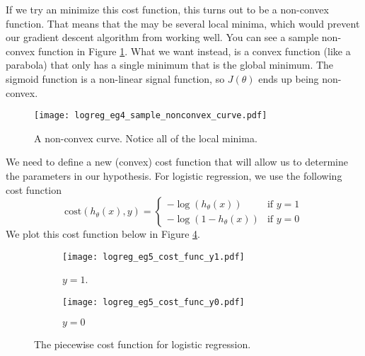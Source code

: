 If we try an minimize this cost function, this turns out to be a non-convex function. That means that the may be several local minima, which would prevent our gradient descent algorithm from working well. You can see a sample non-convex function in Figure \ref{logreg_eg4_sample_nonconvex_curve.pdf}. What we want instead, is a convex function (like a parabola) that only has a single minimum that is the global minimum. The sigmoid function is a non-linear signal function, so $J\left(\theta\right)$ ends up being non-convex. 
\begin{figure}[h] %
	\centering
	\graphicspath{{./Figures/}} %
	\texttt{[image: logreg\_eg4\_sample\_nonconvex\_curve.pdf]} 
	\caption[]{A non-convex curve. Notice all of the local minima.}
	\label{logreg_eg4_sample_nonconvex_curve.pdf}
\end{figure}

We need to define a new (convex) cost function that will allow us to determine the parameters in our hypothesis. For logistic regression, we use the following cost function
\begin{equation}
\text{cost}\left(h_\theta\left(x\right), y\right) = \begin{cases} -\log\left(h_\theta\left(x\right)\right) & \text{if } y = 1 \\ -\log\left(1 - h_\theta\left(x\right)\right) &\text{if } y = 0 \end{cases}
\end{equation}
We plot this cost function below in Figure \ref{chaplogreg-sectcostfunct-plotcostfuncsample}. 

\begin{figure}[h]
	\centering
	\begin{subfigure}[t]{0.45\textwidth}
   		\centering
    		\graphicspath{{./Figures/}}
  		\texttt{[image: logreg\_eg5\_cost\_func\_y1.pdf]} 
   		\caption[]{$y=1$.}
   		\label{logreg_eg5_cost_func_y1.pdf}
	\end{subfigure}
	\begin{subfigure}[t]{0.45\textwidth}
   		\centering
    		\graphicspath{{./Figures/}}
   		\texttt{[image: logreg\_eg5\_cost\_func\_y0.pdf]} 
   		\caption[]{$y=0$}
   		\label{logreg_eg5_cost_func_y0.pdf}
	\end{subfigure}
	\caption[]{The piecewise cost function for logistic regression. }
	\label{chaplogreg-sectcostfunct-plotcostfuncsample}
\end{figure}

